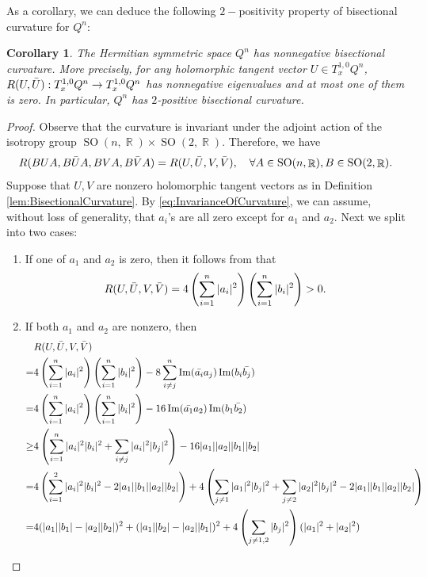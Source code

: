 \documentclass[11pt]{amsart}
\theoremstyle{plain}
\newtheorem{cor}[thm]{Corollary}
\theoremstyle{definition}
\numberwithin{equation}{section}
\DeclareMathOperator{\R}{\mathbb{R}}
\DeclareMathOperator{\SO}{SO}
\DeclareMathOperator{\Imagine}{Im}
\begin{document}
As a corollary, we can deduce the following $2-$positivity property of bisectional curvature for $Q^n$:
\begin{cor}
    The Hermitian symmetric space $Q^n$ has nonnegative bisectional curvature. More precisely, for any holomorphic tangent vector $U\in T^{1,0}_xQ^n$, $R(U,\Bar{U}):T_x^{1,0}Q^n\to T_x^{1,0}Q^n$ has nonnegative eigenvalues and at most one of them is zero. In particular, $Q^n$ has $2$-positive bisectional curvature.
\end{cor}
\begin{proof}
    Observe that the curvature is invariant under the adjoint action of the isotropy group $\SO(n,\R)\times\SO(2,\R)$. Therefore, we have 
    \begin{equation}\label{eq:InvarianceOfCurvature}
    R(BUA,B\Bar{U}A,BVA,B\Bar{V}A)=R(U,\Bar{U},V,\Bar{V}), \quad \forall A\in\SO(n,\R), B\in\SO(2,\R).
    \end{equation}
    Suppose that $U,V$ are nonzero holomorphic tangent vectors as in Definition \ref{lem:BisectionalCurvature}. By \ref{eq:InvarianceOfCurvature}, we can assume, without loss of generality, that $a_i$'s are all zero except for $a_1$ and $a_2$. Next we split into two cases:
    \begin{enumerate}
        \item If one of $a_1$ and $a_2$ is zero, then it follows from  that 
        \[R(U,\Bar{U},V,\Bar{V})=4\left(\sum_{i=1}^n|a_i|^2\right)\left(\sum_{i=1}^n|b_i|^2\right)> 0.\]
        \item If both $a_1$ and $a_2$ are nonzero, then 
        \begin{align*}
            &R(U,\Bar{U},V,\Bar{V})\\
            =&4\left(\sum_{i=1}^n|a_i|^2\right)\left(\sum_{i=1}^n|b_i|^2\right)-8\sum_{i\ne j}^n\Imagine(\Bar{a_i}a_j)\Imagine(b_i\Bar{b_j})\\
            =&4\left(\sum_{i=1}^n|a_i|^2\right)\left(\sum_{i=1}^n|b_i|^2\right)-16\Imagine(\Bar{a_1}a_2)\Imagine(b_1\Bar{b_2})\\
            \ge&4\left(\sum_{i=1}^n|a_i|^2|b_i|^2+\sum_{i\ne j}|a_i|^2|b_j|^2\right)-16|a_1||a_2||b_1||b_2|\\
            =&4\left(\sum_{i=1}^2|a_i|^2|b_i|^2-2|a_1||b_1||a_2||b_2|\right)+4\left(\sum_{j\ne 1}|a_1|^2|b_j|^2+\sum_{j\ne 2}|a_2|^2|b_j|^2-2|a_1||b_1||a_2||b_2|\right)\\
            =&4(|a_1||b_1|-|a_2||b_2|)^2+(|a_1||b_2|-|a_2||b_1|)^2+4\left(\sum_{j\ne 1,2}|b_j|^2\right)(|a_1|^2+|a_2|^2)\\

\end{align*}
\end{enumerate}
\end{proof}
\end{document}

